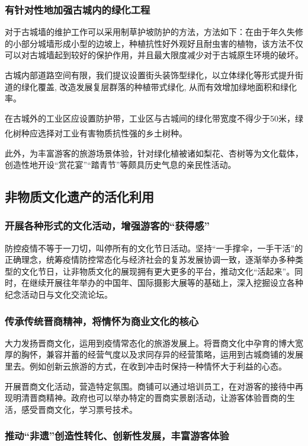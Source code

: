 \documentclass[UTF8]{ctexart}
\newcommand{\upcite}[1]{\textsuperscript{\textsuperscript{\cite{#1}}}}
\begin{document}
        \subsubsection{有针对性地加强古城内的绿化工程}
                对于古城墙的维护工作可以采用制草护坡防护的方法，方法如下：在由于年久失修的小部分城墙形成小型的边坡上，种植抗性好外观好且耐虫害的植物，该方法不仅可以对古城墙起到较好的保护作用，并且最大限度减少对于古城原生环境的破坏。
        
                古城内部道路空间有限，我们提议设置街头装饰型绿化，以立体绿化等形式提升街道的绿化覆盖, 改造发展复层群落的种植带式绿化, 从而有效增加绿地面积和绿化率。
                
                在古城外的工业区应设置防护带，工业区与古城间的绿化带宽度不得少于50米，绿化树种应选择对工业有害物质抗性强的乡土树种。\upcite{赵阔宇2011浅谈边坡生态防护技术在古城墙保护中绿化的应用}

                此外，为丰富游客的旅游场景体验，针对绿化植被诸如梨花、杏树等为文化载体，创造性地开设“赏花宴”“踏青节”等颇具历史气息的亲民性活动。
    \subsection{非物质文化遗产的活化利用}
        \subsubsection{开展各种形式的文化活动，增强游客的“获得感”}
        防控疫情不等于一刀切，叫停所有的文化节日活动。坚持“一手撑伞，一手干活”的正确理念，统筹疫情防控常态化与经济社会的复苏发展协调一致，逐渐举办多种类型的文化节日，让非物质文化的展现拥有更大更多的平台，推动文化“活起来”。同时，在继续开展往年举办的中国年、国际摄影大展等的基础上，深入挖掘设立各种纪念活动日与文化交流论坛。 
        \subsubsection{传承传统晋商精神，将情怀为商业文化的核心}
        大力发扬晋商文化，运用到疫情常态化的旅游发展上。将晋商文化中孕育的博大宽厚的胸怀，兼容并蓄的经营气度以及求同存异的经营策略，运用到古城商铺的发展里去。例如创新云旅游的方式，在收到冲击时保持一种情怀大于利益的心态。
    
        开展晋商文化活动，营造特定氛围。商铺可以通过培训员工，在对游客的接待中再现明清晋商精神。政府也可以举办特定的晋商实景剧活动，让游客体验晋商的生活，感受晋商文化，学习票号技术。
    
        \subsubsection{推动“非遗”创造性转化、创新性发展，丰富游客体验}
    
\end{document}
